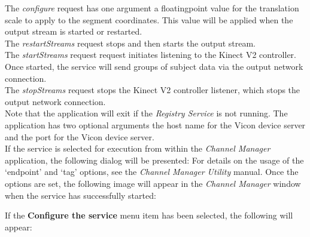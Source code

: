 The \emph{configure} request has one argument \longDash{} a floating\longDash{}point
value for the translation scale to apply to the segment coordinates.
This value will be applied when the output stream is started or restarted.\\ 

The \emph{restartStreams} request stops and then starts the output stream.\\

The \emph{startStreams} request request initiates listening to the Kinect V2 controller.
Once started, the service will send groups of subject data via the output \yarp{} network
connection.\\

The \emph{stopStreams} request stops the Kinect V2 controller listener, which stops the
output \yarp{} network connection.\\ 

Note that the application will exit if the \emph{Registry Service} is not running.
The application has two optional arguments \longDash{} the host name for the Vicon device
server and the port for the Vicon device server.
\insertAppParameters
\insertTagDescription{\KVtwoBI}
\insertInputServiceComment\\

\insertStandardServiceCommands
\secondaryEnd
{}
If the service is selected for execution from within the \emph{Channel Manager}
application, the following dialog will be presented:
\condPage{}
For details on the usage of the `endpoint' and `tag' options, see the \emph{Channel
Manager Utility} manual.
Once the options are set, the following image will appear in the \emph{Channel Manager}
window when the service has successfully started:

If the \textbf{Configure the service} menu item has been selected, the following will
appear:
\secondaryEnd
\primaryEnd{}
